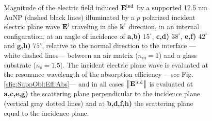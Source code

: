 { \begin{figure}\centering
    \def\svgwidth{.7\textwidth}
    \scriptsize
    \\[-62.75em]
    \hspace*{-.255\textwidth}
        \begin{subfigure}{.25\textwidth}\caption{ } \label{sfig:Near:SuppObl:p:15:perp}\end{subfigure}%
        \begin{subfigure}{.3\textwidth}\caption{ }\label{sfig:Near:SuppObl:p:15:par}\end{subfigure}\\[12.8em]
    \hspace*{-.225\textwidth}
        \begin{subfigure}{.225\textwidth}\caption{ } \label{sfig:Near:SuppObl:p:38:perp}\end{subfigure}%
        \begin{subfigure}{.34\textwidth}\caption{ }\label{sfig:Near:SuppObl:p:38:par}\end{subfigure}\\[12.8em]
    \hspace*{-.225\textwidth}
        \begin{subfigure}{.225\textwidth}\caption{ } \label{sfig:Near:SuppObl:p:42:perp}\end{subfigure}%
        \begin{subfigure}{.34\textwidth}\caption{ }\label{sfig:Near:SuppObl:p:42:par}\end{subfigure}\\[12.8em]
    \hspace*{-.225\textwidth}
        \begin{subfigure}{.225\textwidth}\caption{ } \label{sfig:Near:SuppObl:p:75:perp}\end{subfigure}%
        \begin{subfigure}{.34\textwidth}\caption{ }\label{sfig:Near:SuppObl:p:75:par}\end{subfigure}\\[15.75em]
    \caption[Induced Electric Field of a 12.5 nm Au NP on substrate illuminated at oblique incidence with a $p$ polarized electric field]{\footnotesize%
    Magnitude of the electric field induced $\vb{E}^\text{ind}$ by a supported 12.5 nm AuNP (dashed black lines) illuminated by a $p$ polarized incident electric plane wave $\vb{E}^\text{i}$ traveling in the $\vb{k}^\text{i}$ direction, in an internal configuration, at an angle of incidence of \textbf{a,b)} $15^\circ$, \textbf{c,d)} $38^\circ$, \textbf{e,f)} $42^\circ$ and \textbf{g,h)} $75^\circ$, relative to the normal direction to the interface ---white dashed lines--- between an air matrix ($n_\text{m} = 1$) and a glass substrate ($n_\text{s} = 1.5$). The incident electric plane wave is evaluated at the resonance wavelength of the absorption efficiency ---see Fig. \ref{sfig:SuppObl:Eff:Abs}--- and in all cases $\norm{\vb{E}^\text{ind}}$ is evaluated at  \textbf{a,c,e,g)} the scattering plane perpendicular to the incidence plane (vertical gray dotted lines) and at \textbf{b,d,f,h)} the scattering plane equal to the incidence plane.
}
\end{figure}}
